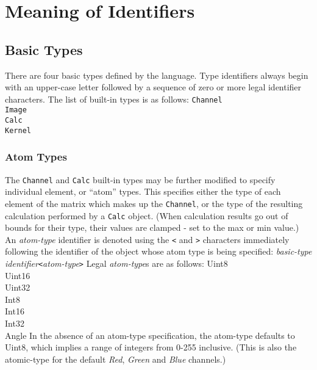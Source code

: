 \section{Meaning of Identifiers}
\label{sec:identmeaning}

\subsection{Basic Types}
\label{ssec:types}
There are four basic types defined by the \sys{} language.
Type identifiers always begin with an upper-case letter followed by a sequence
of zero or more legal identifier characters. The list of built-in types is as follows:
\startsyn
\texttt{Channel} \\
\texttt{Image} \\
\texttt{Calc} \\
\texttt{Kernel}
\stopsyn 

\subsubsection{Atom Types}
\label{sssec:atomtypes}
The \texttt{Channel} and \texttt{Calc} built-in types may be further modified
to specify individual element, or ``atom'' types. This specifies either the type
of each element of the matrix which makes up the \texttt{Channel}, or the type
of the resulting calculation performed by a \texttt{Calc} object. (When calculation
results go out of bounds for their type, their values are clamped - set to the max or min value.)
An \emph{atom-type} identifier is denoted using the \texttt{<} and \texttt{>}
characters immediately following the identifier of the object whose atom type
is being specified:
\startsyn
\emph{basic-type} \emph{identifier}\texttt{<}\emph{atom-type}\texttt{>}
\stopsyn
Legal \emph{atom-type}s are as follows:
\startsyn
Uint8 \\
Uint16 \\
Uint32 \\
Int8 \\
Int16 \\
Int32 \\
Angle
\stopsyn
In the absence of an atom-type specification, the atom-type defaults to Uint8,
which implies a range of integers from 0-255 inclusive. (This is also the atomic-type
for the default \emph{Red}, \emph{Green} and \emph{Blue} channels.)

